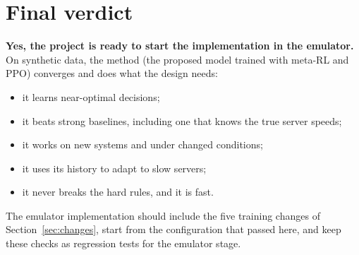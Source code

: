\documentclass[10pt,a4paper]{article}
\begin{document}
\section{Final verdict}
\begin{goodbox}
\textbf{Yes, the project is ready to start the implementation in the emulator.} On synthetic data, the method (the proposed model trained with
meta-RL and PPO) converges and does what the design needs:
\begin{itemize}
\item it learns near-optimal decisions;
\item it beats strong baselines, including one that knows the true server speeds;
\item it works on new systems and under changed conditions;
\item it uses its history to adapt to slow servers;
\item it never breaks the hard rules, and it is fast.
\end{itemize}
The emulator implementation should include the five training changes of Section~\ref{sec:changes}, start from the configuration
that passed here, and keep these checks as regression tests for the emulator stage.
\end{goodbox}
\end{document}
